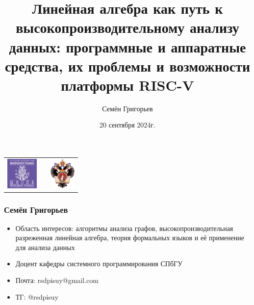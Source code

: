 \documentclass[xcolor=table,aspectratio=169]{beamer}
\title[Разреженная линейная алгебра: зачем и как]{Линейная алгебра как путь к высокопроизводительному анализу данных: программные и аппаратные средства, их проблемы и возможности платформы RISC-V}
\institute[СПбГУ]{
Санкт-Петербургский Государственный Университет
}
\author[Семён Григорьев]{Семён Григорьев}
\date{20 сентября 2024г.}
\begin{document}
{
\begin{frame}[fragile]
  \begin{table}
  \centering
  \begin{tabularx}{\linewidth}{XcX}
    \includegraphics[height=1.6cm]{pictures/YRS.pdf} \hfill
    & 
    & \hfill \includegraphics[height=1.6cm]{pictures/SPbGU_Logo.png}
  \end{tabularx}
  \end{table}
  \titlepage
\end{frame}
}

\begin{frame}[fragile]
  \frametitle{Семён Григорьев}
  \begin{itemize}    
    \item Область интересов: алгоритмы анализа графов, высокопроизводительная разреженная линейная алгебра, теория формальных языков и её применение для анализа данных
    \vspace{2cm}
    \item Доцент кафедры системного программирования СПбГУ
    \item Почта: rsdpisuy@gmail.com 
    \item ТГ: @rsdpisuy
  \end{itemize}
\end{frame}
\end{document}
